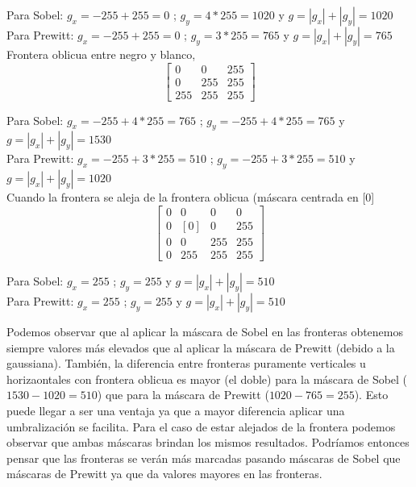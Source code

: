 \documentclass{article}
\begin{document}
Para Sobel:
$
g_x = -255 + 255 = 0
$
; 
$
g_y = 4*255 = 1020
$
 y 
$
g = |g_x| + |g_y| = 1020
$
\\
Para Prewitt:
$
g_x = - 255 + 255 = 0
$
; 
$
g_y = 3 * 255 = 765
$
 y 
$
g  = |g_x| + |g_y| = 765
$
\\

Frontera oblicua entre negro y blanco, 
\[ 
\begin{bmatrix}
    0   &  0  & 255 \\
    0   & 255 & 255 \\
    255 & 255 & 255 
\end{bmatrix} 
\]

Para Sobel:
$
g_x = -255 + 4 * 255 = 765
$
; 
$
g_y = -255 + 4 * 255 = 765
$
 y 
$
g = |g_x| + |g_y| = 1530
$
\\
Para Prewitt:
$
g_x = -255 + 3 * 255 = 510
$
; 
$
g_y = -255 + 3 * 255 = 510
$
 y 
$
g  = |g_x| + |g_y| = 1020
$
\\

Cuando la frontera se aleja de la frontera oblicua (máscara centrada en [0] 
\[ 
\begin{bmatrix}
    0   &  0   &  0  &  0  \\
    0   & [0]  &  0  & 255 \\
    0   &  0   & 255 & 255 \\
    0   &  255 & 255 & 255 
\end{bmatrix} 
\]

Para Sobel:
$
g_x =  255 
$
; 
$
g_y =  255
$
 y 
$
g = |g_x| + |g_y| = 510
$
\\
Para Prewitt:
$
g_x = 255
$
; 
$
g_y = 255
$
 y 
$
g  = |g_x| + |g_y| = 510
$
\\
\begin{par}
Podemos observar que al aplicar la máscara de Sobel en las fronteras obtenemos siempre
valores más elevados que al aplicar la máscara de Prewitt (debido a la gaussiana). 
También, la diferencia entre fronteras puramente verticales u horizaontales con frontera
oblicua es mayor (el doble) para la máscara de Sobel ($1530 - 1020 = 510$) que para la máscara de Prewitt ($1020 - 765 = 255$). Esto puede llegar a ser una ventaja ya que a mayor
diferencia aplicar una umbralización se facilita. 
Para el caso de estar alejados de la frontera podemos observar que ambas máscaras brindan los
mismos resultados. Podríamos entonces pensar que las fronteras se verán más marcadas pasando máscaras de Sobel que máscaras de Prewitt ya que da valores mayores en las fronteras. 
\end{par}
\end{document}
